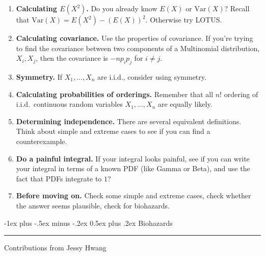 \documentclass[10pt,landscape]{article}
\makeatletter
\newcommand{\var}{\textrm{Var}}
\renewcommand{\section}{\@startsection{section}{1}{0mm}%
                                {-1ex plus -.5ex minus -.2ex}%
                                {0.5ex plus .2ex}%
                                {\normalfont\large\bfseries}}
\makeatother
\begin{document}
\begin{multicols*}{3}
\begin{enumerate}
		\item \textbf{Calculating $E(X^2)$.}  Do you already know $E(X)$ or $\var(X)$? Recall that $\var(X) = E(X^2) - (E(X))^2$. Otherwise try LOTUS.
		
		\item \textbf{Calculating covariance.} Use the properties of covariance. If you're trying to find the covariance between two components of a Multinomial distribution, $X_i, X_j$, then the covariance is $-np_ip_j$ for $i \neq j$.
		
		\item \textbf{Symmetry.} If $X_1,\dots,X_n$ are i.i.d., consider using symmetry.
		
		\item \textbf{Calculating probabilities of orderings.} Remember that all $n!$ ordering of i.i.d.~continuous random variables $X_1,\dots,X_n$ are equally likely.
		
		\item \textbf{Determining independence.} There are several equivalent definitions. Think about simple and extreme cases to see if you can find a counterexample.
		
		\item \textbf{Do a painful integral.} If your integral looks painful, see if you can write your integral in terms of a known PDF (like Gamma or Beta), and use the fact that PDFs integrate to $1$?
		
		\item \textbf{Before moving on.} Check some simple and extreme cases, check whether the answer seems plausible, check for biohazards.
	\end{enumerate}
		      			      					      
		      			      					      
      \section{Biohazards} \smallskip \hrule height 2pt \smallskip
      			      					      
      Contributions from Jessy Hwang
      			      					      

\end{multicols*}
\end{document}
